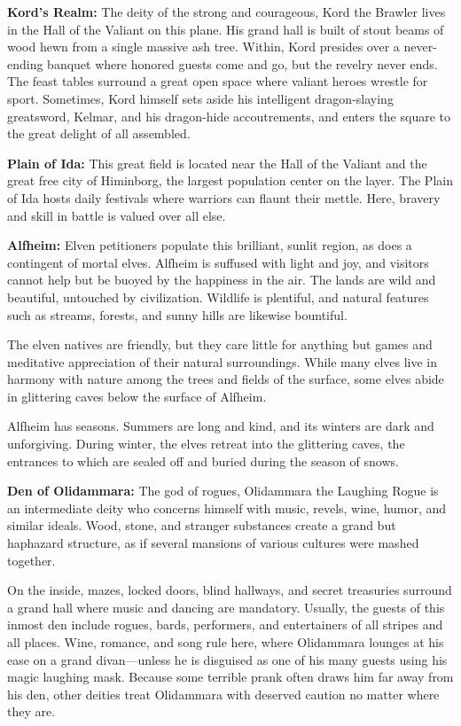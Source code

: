 \textbf{Kord's Realm:} The deity of the strong and courageous, Kord the Brawler lives in the Hall of the Valiant on this plane. His grand hall is built of stout beams of wood hewn from a single massive ash tree. Within, Kord presides over a never-ending banquet where honored guests come and go, but the revelry never ends. The feast tables surround a great open space where valiant heroes wrestle for sport. Sometimes, Kord himself sets aside his intelligent dragon-slaying greatsword, Kelmar, and his dragon-hide accoutrements, and enters the square to the great delight of all assembled.

\textbf{Plain of Ida:} This great field is located near the Hall of the Valiant and the great free city of Himinborg, the largest population center on the layer. The Plain of Ida hosts daily festivals where warriors can flaunt their mettle. Here, bravery and skill in battle is valued over all else.

\textbf{Alfheim:} Elven petitioners populate this brilliant, sunlit region, as does a contingent of mortal elves. Alfheim is suffused with light and joy, and visitors cannot help but be buoyed by the happiness in the air. The lands are wild and beautiful, untouched by civilization. Wildlife is plentiful, and natural features such as streams, forests, and sunny hills are likewise bountiful.

The elven natives are friendly, but they care little for anything but games and meditative appreciation of their natural surroundings. While many elves live in harmony with nature among the trees and fields of the surface, some elves abide in glittering caves below the surface of Alfheim.

Alfheim has seasons. Summers are long and kind, and its winters are dark and unforgiving. During winter, the elves retreat into the glittering caves, the entrances to which are sealed off and buried during the season of snows.

\textbf{Den of Olidammara:} The god of rogues, Olidammara the Laughing Rogue is an intermediate deity who concerns himself with music, revels, wine, humor, and similar ideals. Wood, stone, and stranger substances create a grand but haphazard structure, as if several mansions of various cultures were mashed together.

On the inside, mazes, locked doors, blind hallways, and secret treasuries surround a grand hall where music and dancing are mandatory. Usually, the guests of this inmost den include rogues, bards, performers, and entertainers of all stripes and all places. Wine, romance, and song rule here, where Olidammara lounges at his ease on a grand divan---unless he is disguised as one of his many guests using his magic laughing mask. Because some terrible prank often draws him far away from his den, other deities treat Olidammara with deserved caution no matter where they are.


